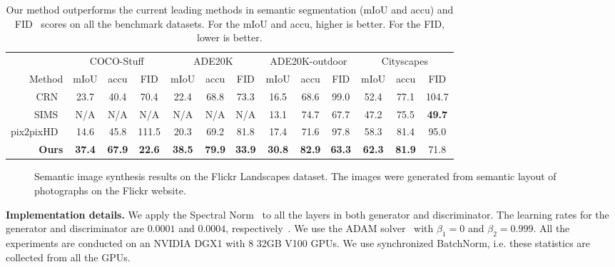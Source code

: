 \begin{table}[tb!]

	\centering
	\small
    \begin{tabular}{r||c|c|c|c|c|c|c|c|c|c|c|c}
& \multicolumn{3}{c}{COCO-Stuff}  & \multicolumn{3}{|c}{ADE20K} & \multicolumn{3}{|c}{ADE20K-outdoor} & \multicolumn{3}{|c}{Cityscapes} \\
\cline{2-13}
Method & mIoU & accu & FID & mIoU & accu & FID & mIoU & accu & FID & mIoU & accu & FID \\
\Xhline{2\arrayrulewidth}
CRN~\cite{chen2017photographic} & 23.7& 40.4& 70.4& 22.4& 68.8& 73.3& 16.5& 68.6& 99.0& 52.4& 77.1& 104.7 \\
SIMS~\cite{qi2018semi} &  N/A& N/A& N/A& N/A& N/A& N/A& 13.1& 74.7& 67.7& 47.2& 75.5& {\bf49.7}\\
pix2pixHD~\cite{wang2018pix2pixHD} & 14.6& 45.8& 111.5& 20.3& 69.2& 81.8& 17.4& 71.6& 97.8& 58.3& 81.4& 95.0 \\
{\bf Ours } &  {\bf37.4} &  {\bf 67.9} &  {\bf 22.6} &  {\bf 38.5} &  {\bf 79.9} &  {\bf 33.9} &  {\bf 30.8} &  {\bf 82.9} &  {\bf 63.3} &  {\bf 62.3} &  {\bf 81.9} & 71.8 \\
	\end{tabular}
	\caption{Our method outperforms the current leading methods in semantic segmentation (mIoU and accu) and FID~\cite{heusel2017gans} scores on all the benchmark datasets. For the mIoU and accu, higher is better. For the FID, lower is better.}
	\label{tbl::comparison}		

 \end{table}

\begin{figure}[]
  \centering

  \caption{Semantic image synthesis results on the Flickr Landscapes dataset. The images were generated from semantic layout of photographs on the Flickr website.}  \label{fig::flickr}

\end{figure}

{\bf Implementation details.} We apply the Spectral Norm~\cite{miyato2018spectral} to all the layers in both generator and discriminator. The learning rates for the generator and discriminator are $0.0001$ and $0.0004$, respectively~\cite{heusel2017gans}. We use the ADAM solver~\cite{kingma2015adam} with $\beta_1=0$ and $\beta_2=0.999$. All the experiments are conducted on an NVIDIA DGX1 with 8 32GB V100 GPUs. We use synchronized BatchNorm, i.e. these statistics are collected from all the GPUs.

